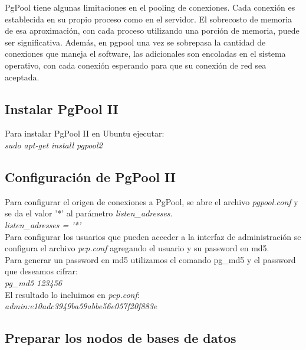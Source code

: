 PgPool tiene algunas limitaciones en el pooling de conexiones. Cada conexión es establecida en su propio proceso como en el servidor. El sobrecosto de memoria de esa aproximación, con cada proceso utilizando una porción de memoria, puede ser significativa. Además, en pgpool una vez se sobrepasa la cantidad de conexiones que maneja el software, las adicionales son encoladas en el sistema operativo, con cada conexión esperando para que su conexión de red sea aceptada. 

\subsection{Instalar PgPool II}

Para instalar PgPool II en Ubuntu ejecutar:\\

\emph{sudo apt-get install pgpool2}\\

\subsection{Configuración de PgPool II}

Para configurar el origen de conexiones a PgPool, se abre el archivo \textit{pgpool.conf} y se da el valor '*' al parámetro \textit{listen\_adresses}.\\

\textit{listen\_adresses = '*'}\\

Para configurar los usuarios que pueden acceder a la interfaz de administración se configura el archivo \textit{pcp.conf} agregando el usuario y su password en md5.\\

Para generar un password en md5 utilizamos el comando pg\_md5 y el password que deseamos cifrar:\\

\emph{pg\_md5 123456}\\

El resultado lo incluimos en \textit{pcp.conf}:\\

\emph{admin:e10adc3949ba59abbe56e057f20f883e} \\

\subsection{Preparar los nodos de bases de datos}

